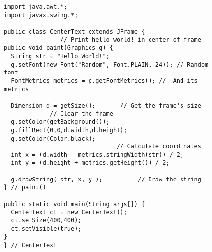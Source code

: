 \begin{figure}[h!]
\jjjprogstart
\begin{jjjlisting}[28pc]
\begin{lstlisting}
import java.awt.*;
import javax.swing.*;

public class CenterText extends JFrame {
                // Print hello world! in center of frame
public void paint(Graphics g) {
  String str = "Hello World!";
  g.setFont(new Font("Random", Font.PLAIN, 24)); // Random font
  FontMetrics metrics = g.getFontMetrics(); //  And its metrics

  Dimension d = getSize();       // Get the frame's size
             // Clear the frame
  g.setColor(getBackground());
  g.fillRect(0,0,d.width,d.height);
  g.setColor(Color.black);
                                // Calculate coordinates
  int x = (d.width - metrics.stringWidth(str)) / 2; 
  int y = (d.height + metrics.getHeight()) / 2;

  g.drawString( str, x, y );          // Draw the string
} // paint()

public static void main(String args[]) {
  CenterText ct = new CenterText();
  ct.setSize(400,400);
  ct.setVisible(true);
}
} // CenterText
\end{lstlisting}
\end{jjjlisting}
\end{figure}



\begin{figure}[bt]
\end{figure}


